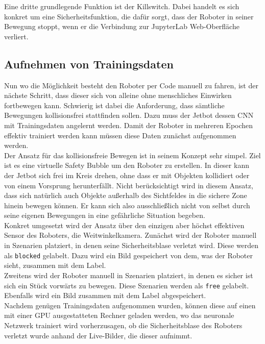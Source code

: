 Eine dritte grundlegende Funktion ist der \glqq Killswitch\grqq{}. Dabei handelt es sich konkret um eine Sicherheitsfunktion, die dafür sorgt, dass der Roboter in seiner Bewegung stoppt, wenn er die Verbindung zur JupyterLab Web-Oberfläche verliert.

\subsection{Aufnehmen von Trainingsdaten}

Nun wo die Möglichkeit besteht den Roboter per Code manuell zu fahren, ist der nächste Schritt, dass dieser sich von alleine ohne menschliches Einwirken fortbewegen kann. Schwierig ist dabei die Anforderung, dass sämtliche Bewegungen kollisionsfrei stattfinden sollen. Dazu muss der Jetbot \bzw dessen CNN mit Trainingsdaten angelernt werden. Damit der Roboter in mehreren Epochen effektiv trainiert werden kann müssen diese Daten zunächst aufgenommen werden.\\
Der Ansatz für das kollisionsfreie Bewegen ist in seinem Konzept sehr simpel. Ziel ist es eine virtuelle \glqq Safety Bubble\grqq{} um den Roboter zu erstellen. In dieser kann der Jetbot sich frei im Kreis drehen, ohne dass er mit Objekten kollidiert oder von einem Vorsprung herunterfällt. Nicht berücksichtigt wird in diesem Ansatz, dass sich natürlich auch Objekte außerhalb des Sichtfeldes in die sichere Zone hinein bewegen können. Er kann sich also ausschließlich nicht von selbst durch seine eigenen Bewegungen in eine \glqq gefährliche Situation\grqq{} begeben.\\
Konkret umgesetzt wird der Ansatz über den einzigen aber höchst effektiven Sensor des Roboters, die Weitwinkelkamera. Zunächst wird der Roboter manuell in Szenarien platziert, in denen seine Sicherheitsblase verletzt wird. Diese werden als \glqq\texttt{blocked}\grqq{} gelabelt. Dazu wird ein Bild gespeichert von dem, was der Roboter sieht, zusammen mit dem Label.\\
Zweitens wird der Roboter manuell in Szenarien platziert, in denen es sicher ist sich ein Stück vorwärts zu bewegen. Diese Szenarien werden als \glqq\texttt{free}\grqq{} gelabelt. Ebenfalls wird ein Bild zusammen mit dem Label abgespeichert.\\
Nachdem genügen Trainingsdaten aufgenommen wurden, können diese auf einen mit einer GPU ausgestatteten Rechner geladen werden, wo das neuronale Netzwerk trainiert wird vorherzusagen, ob die Sicherheitsblase des Roboters verletzt wurde anhand der Live-Bilder, die dieser aufnimmt.

